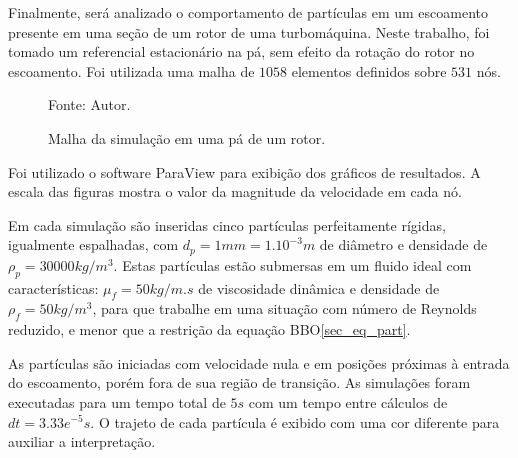 \begin{itemize}
        Finalmente, será analizado o comportamento de partículas em um escoamento presente em uma seção de um rotor de uma turbomáquina.
        Neste trabalho, foi tomado um referencial estacionário na pá, sem efeito da rotação do rotor no escoamento.
        Foi utilizada uma malha de $1058$ elementos definidos sobre $531$ nós.
        \begin{figure}[H]
            \centering
             {\raggedleft \scriptsize Fonte: Autor.}
            \caption{Malha da simulação em uma pá de um rotor.}
            \label{rotor_mesh}
        \end{figure}
\end{itemize}

Foi utilizado o software ParaView para exibição dos gráficos de resultados.
A escala das figuras mostra o valor da magnitude da velocidade em cada nó.

Em cada simulação são inseridas cinco partículas perfeitamente rígidas, igualmente espalhadas, com $d_p=1mm=1.10^{-3}m$ de diâmetro e densidade de $\rho_p=30000kg/m^3$.
Estas partículas estão submersas em um fluido ideal com características: $\mu_f=50kg/m.s$ de viscosidade dinâmica e densidade de $\rho_f=50kg/m^3$, para que trabalhe em uma situação com número de Reynolds reduzido, e menor que a restrição da equação BBO\ref{sec_eq_part}.

As partículas são iniciadas com velocidade nula e em posições próximas à entrada do escoamento, porém fora de sua região de transição.
As simulações foram executadas para um tempo total de $5s$ com um tempo entre cálculos de $dt=3.33e^{-5}s$.
O trajeto de cada partícula é exibido com uma cor diferente para auxiliar a interpretação. 

